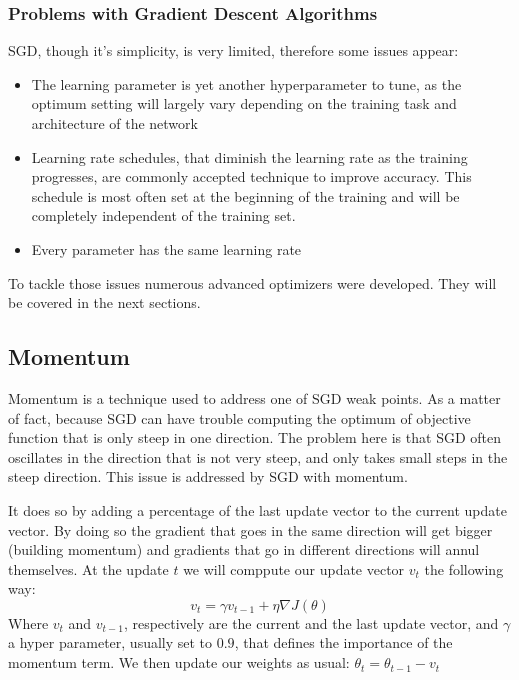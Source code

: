 \subsubsection{Problems with Gradient Descent Algorithms}
SGD, though it's simplicity, is very limited, therefore some issues appear:

\begin{itemize}
\item The learning parameter is yet another hyperparameter to tune, as the optimum setting will largely vary depending on the training task and architecture of the network
\item Learning rate schedules, that diminish the learning rate as the training progresses, are commonly accepted technique to improve accuracy. This schedule is most often set at the beginning of the training and will be completely independent of the training set. 
\item Every parameter has the same learning rate
\end{itemize}
To tackle those issues numerous advanced optimizers were developed. They will be covered in the next sections. 

\subsection{Momentum}
Momentum is a technique used to address one of SGD weak points. As a matter of fact, because SGD can have trouble computing the optimum of objective function that is only steep in one direction. The problem here is that SGD often oscillates in the direction that is not very steep, and only takes small steps in the steep direction. This issue is addressed by SGD with momentum. 

It does so by adding a percentage of the last update vector to the current update vector. By doing so the gradient that goes in the same direction will get bigger (building momentum) and gradients that go in different directions will annul themselves. 
 At the update $t$ we will comppute our update vector $v_t$ the following way:
\begin{equation}
v_t = \gamma v_{t-1} + \eta \nabla J (\theta)
\end{equation}\label{eq:momentum}
Where $v_t$ and $v_{t-1}$, respectively are the current and the last update vector, and $\gamma$ a hyper parameter, usually set to $0.9$, that defines the importance of the momentum term. We then update our weights as usual: $\theta_t = \theta_{t-1} - v_t$ 
